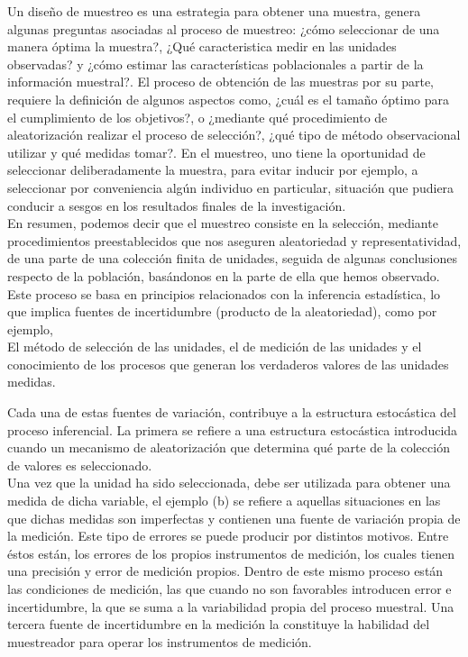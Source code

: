 \documentclass[base=hide,11pt]{elegantbook}
\begin{document}
Un diseño de muestreo es una estrategia para obtener una muestra, genera algunas preguntas asociadas al proceso de muestreo: ¿cómo seleccionar de una manera \'optima la muestra?, ¿Qué caracteristica medir en las unidades observadas? y ¿c\'omo estimar las caracter\'isticas poblacionales a partir de la información muestral?. El proceso de obtenci\'on de las muestras por su parte, requiere la definici\'on de algunos aspectos como, ¿cu\'al es el tamaño \'optimo para el cumplimiento de los objetivos?, o  ¿mediante qu\'e procedimiento de aleatorizaci\'on realizar el proceso de selecci\'on?, ¿qu\'e tipo de m\'etodo observacional utilizar y qu\'e medidas tomar?. En el muestreo, uno tiene la oportunidad de seleccionar deliberadamente la  muestra, para evitar  inducir por ejemplo, a seleccionar por conveniencia alg\'un individuo en particular, situaci\'on que pudiera conducir a sesgos en los resultados finales de la investigaci\'on.\\
	
En resumen, podemos decir que el muestreo consiste en la selección, mediante procedimientos preestablecidos que nos aseguren aleatoriedad y representatividad,  de una parte de una colecci\'on finita de unidades, seguida de algunas conclusiones respecto de la población, bas\'andonos en la parte de ella que hemos observado. Este proceso se basa en principios relacionados con la inferencia estadística, lo que implica fuentes de incertidumbre (producto de la aleatoriedad), como por ejemplo,\\

El método de selección de las unidades,
el de medición de las unidades y
el conocimiento de los procesos que generan los verdaderos valores de las unidades medidas.


Cada una de estas fuentes de variaci\'on, contribuye a la estructura estoc\'astica del proceso inferencial. La primera se refiere a una estructura estoc\'astica introducida cuando un mecanismo de aleatorizaci\'on que determina qu\'e parte de la colecci\'on de valores es seleccionado.\\
	
Una vez que la unidad ha sido seleccionada, debe ser utilizada para obtener una medida de dicha variable, el ejemplo (b) se refiere a aquellas situaciones en las que dichas medidas son imperfectas y contienen una fuente de variaci\'on propia de la medici\'on. Este tipo de errores se puede producir por distintos motivos. Entre \'estos est\'an, los errores de los propios instrumentos de medici\'on, los cuales tienen una precisi\'on y error de medici\'on propios. Dentro de este mismo proceso est\'an las condiciones de medici\'on, las que cuando no son favorables introducen error e incertidumbre, la que se suma a la variabilidad propia del proceso muestral. Una tercera fuente de incertidumbre en la medición la constituye la habilidad del muestreador para operar los instrumentos de medición.\\
	
\end{document}
